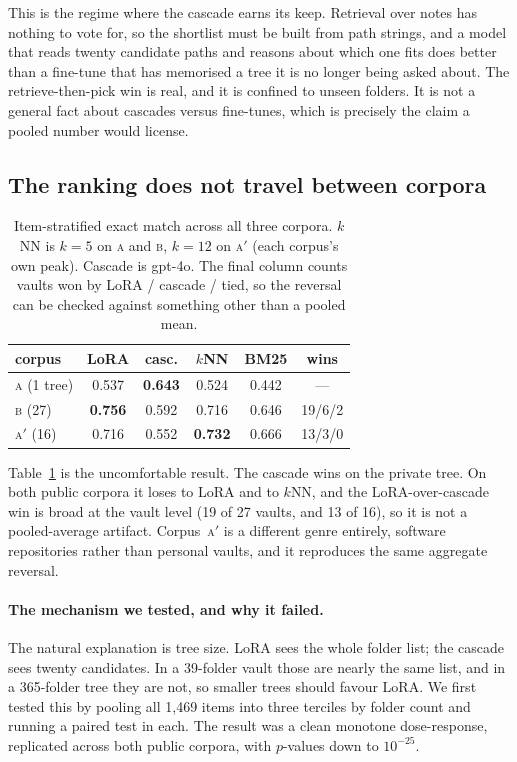 \documentclass[11pt]{article}
\newcommand{\corpA}{\textsc{a}}
\newcommand{\corpB}{\textsc{b}}
\newcommand{\corpAp}{\textsc{a}$'$}
\begin{document}
This is the regime where the cascade earns its keep.
Retrieval over notes has nothing to vote for, so the shortlist must be built from path strings, and a model that reads twenty candidate paths and reasons about which one fits does better than a fine-tune that has memorised a tree it is no longer being asked about.
The retrieve-then-pick win is real, and it is confined to unseen folders.
It is not a general fact about cascades versus fine-tunes, which is precisely the claim a pooled number would license.

\subsection{The ranking does not travel between corpora}
\label{sec:reversal}

\begin{table}[t]
  \centering
  \small
  \setlength{\tabcolsep}{4pt}
  \begin{tabular}{lccccc}
    \toprule
    corpus & LoRA & casc. & $k$NN & BM25 & wins \\
    \midrule
    \corpA{} (1 tree)     & 0.537 & \textbf{0.643} & 0.524 & 0.442 & --- \\
    \corpB{} (27)  & \textbf{0.756} & 0.592 & 0.716 & 0.646 & 19/6/2 \\
    \corpAp{} (16) & 0.716 & 0.552 & \textbf{0.732} & 0.666 & 13/3/0 \\
    \bottomrule
  \end{tabular}
  \caption{Item-stratified exact match across all three corpora. $k$NN is $k{=}5$ on \corpA{} and \corpB{}, $k{=}12$ on \corpAp{} (each corpus's own peak). Cascade is gpt-4o. The final column counts vaults won by LoRA / cascade / tied, so the reversal can be checked against something other than a pooled mean.}
  \label{tab:crosscorpus}
\end{table}

Table~\ref{tab:crosscorpus} is the uncomfortable result.
The cascade wins on the private tree.
On both public corpora it loses to LoRA and to $k$NN, and the LoRA-over-cascade win is broad at the vault level (19 of 27 vaults, and 13 of 16), so it is not a pooled-average artifact.
Corpus~\corpAp{} is a different genre entirely, software repositories rather than personal vaults, and it reproduces the same aggregate reversal.

\paragraph{The mechanism we tested, and why it failed.}
The natural explanation is tree size.
LoRA sees the whole folder list; the cascade sees twenty candidates.
In a 39-folder vault those are nearly the same list, and in a 365-folder tree they are not, so smaller trees should favour LoRA.
We first tested this by pooling all 1{,}469 items into three terciles by folder count and running a paired test in each.
The result was a clean monotone dose-response, replicated across both public corpora, with $p$-values down to $10^{-25}$.
\end{document}
